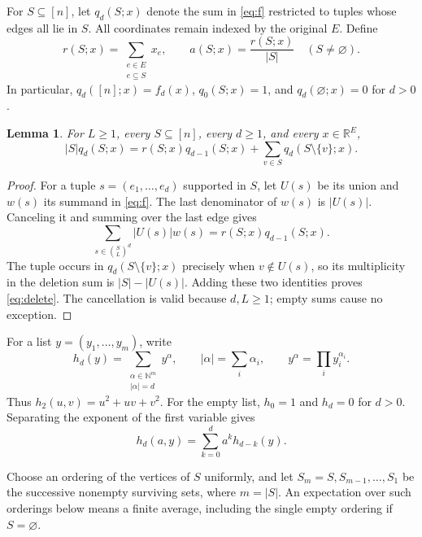 \documentclass[11pt]{article}
\newtheorem{lemma}[theorem]{Lemma}
\newcommand{\R}{\mathbb R}
\newcommand{\N}{\mathbb N}
\begin{document}
For $S\subseteq[n]$, let $q_d(S;x)$ denote the sum in \eqref{eq:f}
restricted to tuples whose edges all lie in $S$. All coordinates remain
indexed by the original $E$. Define
\[
 r(S;x)=\sum_{\substack{e\in E\\e\subseteq S}}x_e,
 \qquad a(S;x)=\frac{r(S;x)}{|S|}\quad(S\ne\varnothing).
\]
In particular, $q_d([n];x)=f_d(x)$, $q_0(S;x)=1$, and
$q_d(\varnothing;x)=0$ for $d>0$.

\begin{lemma}\label{lem:delete}
For $L\geq1$, every $S\subseteq[n]$, every $d\geq1$, and every
$x\in\R^E$,
\begin{equation}\label{eq:delete}
 |S|q_d(S;x)=r(S;x)q_{d-1}(S;x)
                    +\sum_{v\in S}q_d(S\setminus\{v\};x).
\end{equation}
\end{lemma}
\begin{proof}
For a tuple $s=(e_1,\ldots,e_d)$ supported in $S$, let $U(s)$ be its
union and $w(s)$ its summand in \eqref{eq:f}. The last denominator of
$w(s)$ is $|U(s)|$. Canceling it and summing over the last edge gives
\[
 \sum_{s\in\binom{S}{L}^d}|U(s)|w(s)
       =r(S;x)q_{d-1}(S;x).
\]
The tuple occurs in $q_d(S\setminus\{v\};x)$ precisely when $v\notin U(s)$,
so its multiplicity in the deletion sum is $|S|-|U(s)|$.
Adding these two identities proves \eqref{eq:delete}.
The cancellation is valid because $d,L\geq1$; empty sums cause no exception.
\end{proof}

For a list $y=(y_1,\ldots,y_m)$, write
\[
 h_d(y)=\sum_{\substack{\alpha\in\N^m\\|\alpha|=d}}y^\alpha,
 \qquad |\alpha|=\sum_i\alpha_i,\qquad
 y^\alpha=\prod_i y_i^{\alpha_i}.
\]
Thus $h_2(u,v)=u^2+uv+v^2$. For the empty list, $h_0=1$ and
$h_d=0$ for $d>0$. Separating the exponent of the first variable gives
\begin{equation}\label{eq:hrec}
 h_d(a,y)=\sum_{k=0}^d a^k h_{d-k}(y).
\end{equation}

Choose an ordering of the vertices of $S$ uniformly, and let
$S_m=S,S_{m-1},\ldots,S_1$ be the successive nonempty surviving sets,
where $m=|S|$. An expectation over such orderings below means a finite
average, including the single empty ordering if $S=\varnothing$.
\end{document}
